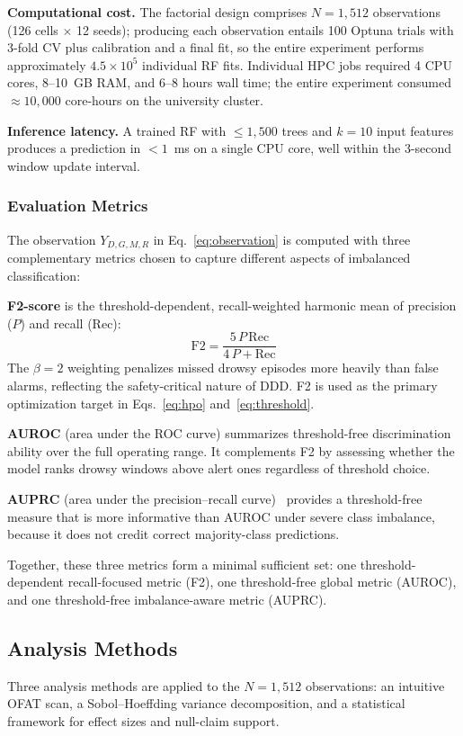 \documentclass[lettersize,journal]{IEEEtran}
\begin{document}
\textbf{Computational cost.}
The factorial design comprises $N = 1{,}512$ observations (126 cells $\times$ 12 seeds); producing each observation entails 100 Optuna trials with 3-fold CV plus calibration and a final fit, so the entire experiment performs approximately $4.5 \times 10^5$ individual RF fits.
Individual HPC jobs required 4 CPU cores, 8--10~GB RAM, and 6--8 hours wall time; the entire experiment consumed $\approx 10{,}000$ core-hours on the university cluster.

\textbf{Inference latency.}
A trained RF with $\leq 1{,}500$ trees and $k = 10$ input features produces a prediction in $< 1$~ms on a single CPU core, well within the 3-second window update interval.

\subsubsection{Evaluation Metrics}\label{sec:metrics}
The observation $Y_{D,G,M,R}$ in Eq.~\eqref{eq:observation} is computed with three complementary metrics chosen to capture different aspects of imbalanced classification:

\textbf{F2-score} is the threshold-dependent, recall-weighted harmonic mean of precision ($P$) and recall ($\mathrm{Rec}$):
\begin{equation}
\label{eq:f2}
\mathrm{F2} = \frac{5\,P\,\mathrm{Rec}}{4\,P + \mathrm{Rec}}
\end{equation}
The $\beta = 2$ weighting penalizes missed drowsy episodes more heavily than false alarms, reflecting the safety-critical nature of DDD.
F2 is used as the primary optimization target in Eqs.~\eqref{eq:hpo} and~\eqref{eq:threshold}.

\textbf{AUROC} (area under the ROC curve) summarizes threshold-free discrimination ability over the full operating range.
It complements F2 by assessing whether the model ranks drowsy windows above alert ones regardless of threshold choice.

\textbf{AUPRC} (area under the precision--recall curve)~\cite{saito2015} provides a threshold-free measure that is more informative than AUROC under severe class imbalance, because it does not credit correct majority-class predictions.

Together, these three metrics form a minimal sufficient set: one threshold-dependent recall-focused metric (F2), one threshold-free global metric (AUROC), and one threshold-free imbalance-aware metric (AUPRC).

\subsection{Analysis Methods}\label{sec:analysis_methods}
Three analysis methods are applied to the $N = 1{,}512$ observations: an intuitive OFAT scan, a Sobol--Hoeffding variance decomposition, and a statistical framework for effect sizes and null-claim support.
\end{document}

